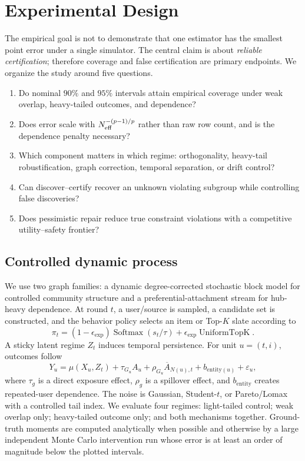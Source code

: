 \section{Experimental Design}
\label{sec:experiments}

The empirical goal is not to demonstrate that one estimator has the smallest point error under a single simulator. The central claim is about \emph{reliable certification}; therefore coverage and false certification are primary endpoints. We organize the study around five questions.

\begin{enumerate}[leftmargin=1.4em,itemsep=1pt,topsep=2pt]
    \item[\textbf{RQ1}] Do nominal $90\%$ and $95\%$ intervals attain empirical coverage under weak overlap, heavy-tailed outcomes, and dependence?
    \item[\textbf{RQ2}] Does error scale with $N_{\mathrm{eff}}^{-(p-1)/p}$ rather than raw row count, and is the dependence penalty necessary?
    \item[\textbf{RQ3}] Which component matters in which regime: orthogonality, heavy-tail robustification, graph correction, temporal separation, or drift control?
    \item[\textbf{RQ4}] Can discover--certify recover an unknown violating subgroup while controlling false discoveries?
    \item[\textbf{RQ5}] Does pessimistic repair reduce true constraint violations with a competitive utility--safety frontier?
\end{enumerate}

\subsection{Controlled dynamic process}
We use two graph families: a dynamic degree-corrected stochastic block model for controlled community structure and a preferential-attachment stream for hub-heavy dependence. At round $t$, a user/source is sampled, a candidate set is constructed, and the behavior policy selects an item or Top-$K$ slate according to
\begin{equation}
\pi_t=(1-\epsilon_{\mathrm{exp}})
\operatorname{Softmax}(s_t/\tau)
+\epsilon_{\mathrm{exp}}\operatorname{UniformTopK}.
\label{eq:synthetic-policy}
\end{equation}
A sticky latent regime $Z_t$ induces temporal persistence. For unit $u=(t,i)$, outcomes follow
\begin{equation}
Y_u=\mu(X_u,Z_t)
+\tau_{G_u}A_u
+\rho_{G_u}\overline A_{N(u),t}
+b_{\mathrm{entity}(u)}
+\varepsilon_u,
\label{eq:synthetic-outcome}
\end{equation}
where $\tau_g$ is a direct exposure effect, $\rho_g$ is a spillover effect, and $b_{\mathrm{entity}}$ creates repeated-user dependence. The noise is Gaussian, Student-$t$, or Pareto/Lomax with a controlled tail index. We evaluate four regimes: light-tailed control; weak overlap only; heavy-tailed outcome only; and both mechanisms together. Ground-truth moments are computed analytically when possible and otherwise by a large independent Monte Carlo intervention run whose error is at least an order of magnitude below the plotted intervals.

